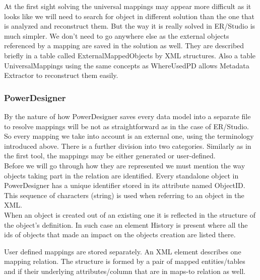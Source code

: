 At the first sight solving the universal mappings may appear more difficult as it looks like we will need to search for object in different solution than the one that is analyzed and reconstruct them. But the way it is really solved in ER/Studio is much simpler. We don't need to go anywhere else as the external objects referenced by a mapping are saved in the solution as well. They are described briefly in a table called External\textunderscore Mapped\textunderscore Objects by XML structures.
Also a table Universal\textunderscore Mappings using the same concepts as Where\textunderscore Used\textunderscore PD allows Metadata Extractor to reconstruct them easily.

\subsubsection{PowerDesigner}

By the nature of how PowerDesigner saves every data model into a separate file to resolve mappings will be not as straightforward as in the case of ER/Studio.
So every mapping we take into account is an external one, using the terminology introduced above. There is a further division into two categories. Similarly as in the first tool, the mappings may be either generated or user-defined. \\ 

Before we will go through how they are represented we must mention the way objects taking part in the relation are identified.
Every standalone object in PowerDesigner has a unique identifier stored in its attribute named ObjectID. This sequence of characters (string) is used when referring to an object in the XML.\\

When an object is created out of an existing one it is reflected in the structure of the object's definition. In such case an element History is present where all the ids of objects that made an impact on the objects creation are listed there.

User defined mappings are stored separately. 
An XML element describes one mapping relation. The structure is formed by a pair of mapped entities/tables and if their underlying attributes/column that are in maps-to relation as well.

